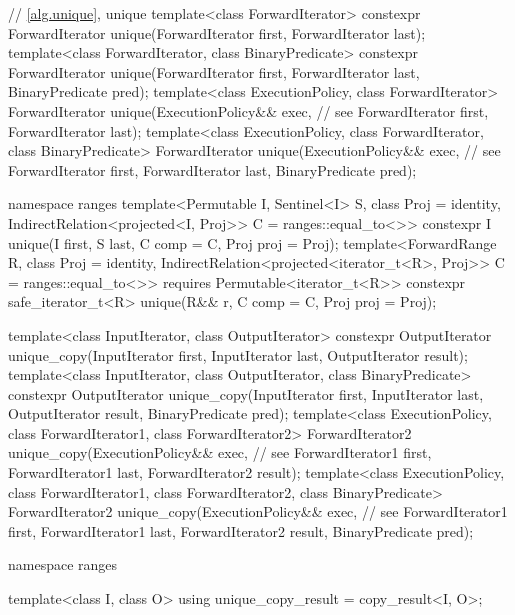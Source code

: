 \begin{codeblock}
  // \ref{alg.unique}, unique
  template<class ForwardIterator>
    constexpr ForwardIterator unique(ForwardIterator first, ForwardIterator last);
  template<class ForwardIterator, class BinaryPredicate>
    constexpr ForwardIterator unique(ForwardIterator first, ForwardIterator last,
                                     BinaryPredicate pred);
  template<class ExecutionPolicy, class ForwardIterator>
    ForwardIterator unique(ExecutionPolicy&& exec, // see 
                           ForwardIterator first, ForwardIterator last);
  template<class ExecutionPolicy, class ForwardIterator, class BinaryPredicate>
    ForwardIterator unique(ExecutionPolicy&& exec, // see 
                           ForwardIterator first, ForwardIterator last,
                           BinaryPredicate pred);
\end{codeblock}\begin{addedblock}\begin{codeblock}
  namespace ranges {
    template<Permutable I, Sentinel<I> S, class Proj = identity,
        IndirectRelation<projected<I, Proj>> C = ranges::equal_to<>>
      constexpr I unique(I first, S last, C comp = C{}, Proj proj = Proj{});
    template<ForwardRange R, class Proj = identity,
        IndirectRelation<projected<iterator_t<R>, Proj>> C = ranges::equal_to<>>
      requires Permutable<iterator_t<R>>
      constexpr safe_iterator_t<R>
        unique(R&& r, C comp = C{}, Proj proj = Proj{});
  }
\end{codeblock}\end{addedblock}\begin{codeblock}
  template<class InputIterator, class OutputIterator>
    constexpr OutputIterator
      unique_copy(InputIterator first, InputIterator last,
                  OutputIterator result);
  template<class InputIterator, class OutputIterator, class BinaryPredicate>
    constexpr OutputIterator
      unique_copy(InputIterator first, InputIterator last,
                  OutputIterator result, BinaryPredicate pred);
  template<class ExecutionPolicy, class ForwardIterator1, class ForwardIterator2>
    ForwardIterator2
      unique_copy(ExecutionPolicy&& exec, // see 
                  ForwardIterator1 first, ForwardIterator1 last,
                  ForwardIterator2 result);
  template<class ExecutionPolicy, class ForwardIterator1, class ForwardIterator2,
           class BinaryPredicate>
    ForwardIterator2
      unique_copy(ExecutionPolicy&& exec, // see 
                  ForwardIterator1 first, ForwardIterator1 last,
                  ForwardIterator2 result, BinaryPredicate pred);
\end{codeblock}\begin{addedblock}\begin{codeblock}
  namespace ranges {
    template<class I, class O>
    using unique_copy_result = copy_result<I, O>;

}
\end{codeblock}
\end{addedblock}
